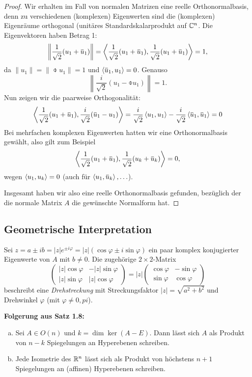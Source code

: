 \begin{proof}
 Wir erhalten im Fall von normalen Matrizen eine reelle Orthonormalbasis, denn zu verschiedenen (komplexen) Eigenwerten sind die (komplexen) Eigenräume orthogonal (uni\-täres Standardskalarprodukt auf $\mathbb{C}^n$. Die Eigenvektoren haben Betrag 1:
 \[ \left\| \rez{\sqrt{2}} ( u_1 + \obar{u}_1 ) \right\| = \scalar{\rez{\sqrt{2}} ( u_1 + \obar{u}_1 ), \rez{\sqrt{2}} ( u_1 + \obar{u}_1 )} = 1, \]
 da $\| u_1 \| = \| \obar{u}_1 \| = 1$ und $\scalar{\obar{u}_1, u_1} = 0$. Genauso
 \[ \left\| \frac{i}{\sqrt{2}} ( u_1 - \obar{u}_1 ) \right\| = 1. \]
 Nun zeigen wir die paarweise Orthogonalität:
 \[ \scalar{\rez{\sqrt{2}} (u_1 + \obar{u}_1), \frac{i}{\sqrt{2}} (\obar{u}_1 - u_1)} = \frac{i}{\sqrt{2}} \scalar{u_1, u_1} - \frac{i}{\sqrt{2}} \scalar{\obar{u}_1, \obar{u}_1} = 0 \]
 Bei mehrfachen komplexen Eigenwerten hatten wir eine Orthonormalbasis gewählt, also gilt zum Beispiel
 \[ \scalar{\rez{\sqrt{2}} ( u_1 + \obar{u}_1 ), \rez{\sqrt{2}} ( u_k + \obar{u}_k )} = 0, \]
 wegen $\left\langle u_1, u_k \right\rangle = 0$ (auch für $\scalar{u_1, \obar{u}_k}, \ldots$).
 
 Insgesamt haben wir also eine reelle Orthonormalbasis gefunden, bezüglich der die normale Matrix $A$ die gewünschte Normalform hat.
\end{proof}

\subsection*{Geometrische Interpretation}
Sei $z = a \pm ib = |z| e^{\pm i \varphi} = |z| ( \cos \varphi \pm i \sin \varphi)$ ein paar komplex konjugierter Eigenwerte von $A$ mit $b \ne 0$. Die zugehörige $2 \times 2$-Matrix
\[ \begin{pmatrix} |z| \cos \varphi & - |z| \sin \varphi \\ |z| \sin \varphi & |z| \cos \varphi \end{pmatrix}
   = |z| \begin{pmatrix} \cos \varphi & - \sin \varphi \\ \sin \varphi & \cos \varphi \end{pmatrix} \]
beschreibt eine \emph{Drehstreckung} mit Streckungsfaktor $|z| = \sqrt{a^2 + b^2}$ und Drehwinkel $\varphi$ (mit $\varphi \ne 0, pi$).

\textbf{Folgerung aus Satz 1.8:}
\begin{thm}
 \begin{enumerate}[a)]
  \item Sei $A \in O(n)$ und $k = \dim \ker(A-E)$. Dann lässt sich $A$ als Produkt von $n-k$ Spiegelungen an Hyperebenen schreiben.
  \item Jede Isometrie des $\mathbb{R}^n$ lässt sich als Produkt von höchstens $n+1$ Spiegelungen an (affinen) Hyperebenen schreiben.
 \end{enumerate}
\end{thm}


